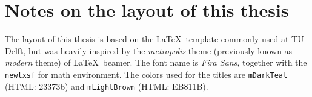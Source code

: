 \chapter{Notes on the layout of this thesis}
\label{app:notes}

The layout of this thesis is based on the \LaTeX \, template commonly used at TU Delft, but was heavily inspired by the \textit{metropolis} theme (previously known as \textit{modern} theme) of \LaTeX \, beamer.
The font name is \textit{Fira Sans}, together with the \texttt{newtxsf} for math environment.
The colors used for the titles are \texttt{mDarkTeal} (HTML: 23373b) and
\texttt{mLightBrown} (HTML: EB811B).



